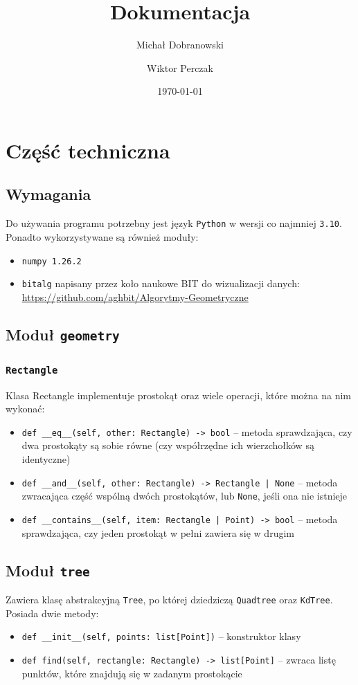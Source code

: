 \documentclass[11pt]{scrartcl}
\title{Dokumentacja}
\author{Michał Dobranowski \and Wiktor Perczak}
\date{\today}
\begin{document}
\maketitle

\tableofcontents

\newpage


\section{Część techniczna}

\subsection{Wymagania}
Do używania programu potrzebny jest język \texttt{Python} w wersji co najmniej \texttt{3.10}. Ponadto wykorzystywane są również moduły:
\begin{itemize}
    \item \texttt{numpy 1.26.2}
    \item \texttt {bitalg} napisany przez koło naukowe BIT do wizualizacji danych: \url{https://github.com/aghbit/Algorytmy-Geometryczne}
\end{itemize}


\subsection{Moduł \texttt{geometry}}

\subsubsection{\texttt{Rectangle}}
Klasa Rectangle implementuje prostokąt oraz wiele operacji, które można na nim wykonać:
\begin{itemize}
    \item \texttt{def \_\_eq\_\_(self, other: Rectangle) -> bool} -- metoda sprawdzająca, czy dwa prostokąty są sobie równe (czy współrzędne ich wierzchołków są identyczne)
    \item \texttt{def \_\_and\_\_(self, other: Rectangle) -> Rectangle | None} -- metoda zwracająca część wspólną dwóch prostokątów, lub \texttt{None}, jeśli ona nie istnieje
    \item \texttt{def \_\_contains\_\_(self, item: Rectangle | Point) -> bool} -- metoda sprawdzająca, czy jeden prostokąt w pełni zawiera się w drugim
\end{itemize}

\subsection{Moduł \texttt{tree}}
Zawiera klasę abstrakcyjną \texttt{Tree}, po której dziedziczą \texttt{Quadtree} oraz \texttt{KdTree}. Posiada dwie metody:
\begin{itemize}
    \item \texttt{def \_\_init\_\_(self, points: list[Point])} -- konstruktor klasy
    \item \texttt{def find(self, rectangle: Rectangle) -> list[Point]} -- zwraca listę punktów, które znajdują się w zadanym prostokącie
\end{itemize}
\end{document}
